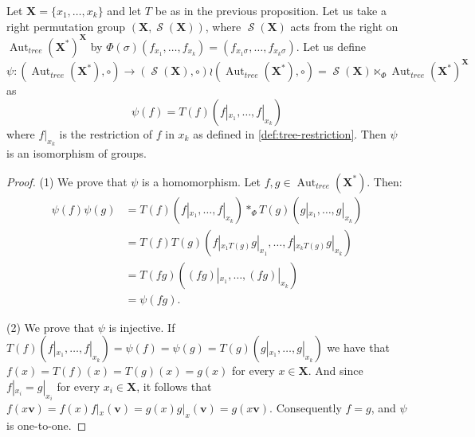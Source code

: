 \documentclass[mat1]{fmfdeloTS2.0}
\newcommand{\word}{\mathbf}				%
\newcommand{\abece}{\mathbf{X}}			%
\newcommand{\fslovar}{\mathbf{X^*}}		%
\DeclareMathOperator{\aut}{\mathrm{Aut}}		%
\DeclareMathOperator{\symm}{\mathcal{S}}		%
\begin{document}
\begin{proposition}\label{prop:isom auttree and wreath}
Let $\abece=\{x_1,\ldots,x_k\}$ and let $T$ be as in the previous proposition. Let us take a right permutation group $(\abece,\symm(\abece))$, where $\symm(\abece)$ acts from the right on $\aut_{tree}(\fslovar)^\abece$ by $\Phi(\sigma)(f_{x_1},\ldots,f_{x_k})=(f_{x_1\sigma},\ldots,f_{x_k\sigma})$. Let us define $\psi:(\aut_{tree}(\fslovar),\circ)\longrightarrow (\symm(\abece),\circ) \wr (\aut_{tree}(\fslovar),\circ) = \symm(\abece)\ltimes_\Phi \aut_{tree}(\fslovar)^\abece$ as
$$\psi(f)=T(f)(f|_{x_1},\ldots,f|_{x_k})$$
where $f|_{x_k}$ is the restriction of $f$ in $x_k$ as defined in \autoref{def:tree-restriction}. Then $\psi$ is an isomorphism of groups.
\end{proposition}
\begin{proof}
(1) We prove that $\psi$ is a homomorphism. Let $f,g\in\aut_{tree}(\fslovar)$. Then:
\begin{align*}
\psi(f)\psi(g)&=T(f)(f|_{x_1},\ldots,f|_{x_k})		*_\Phi	T(g)(g|_{x_1},\ldots,g|_{x_k})\\
&=	T(f)T(g)(f|_{x_1T(g)}g|_{x_1},\ldots ,f|_{x_kT(g)} g|_{x_k})\\
&=T(fg)((fg)|_{x_1},\ldots ,(fg)|_{x_k})\\
&=\psi(fg).
\end{align*}

(2) We prove that $\psi$ is injective. If $T(f)(f|_{x_1},\ldots,f|_{x_k})=\psi(f)=\psi(g)=T(g)(g|_{x_1},\ldots,g|_{x_k})$ we have that $f(x)=T(f)(x)=T(g)(x)=g(x)$ for every $x\in\abece$. And since $f|_{x_i}=g|_{x_i}$ for every $x_i\in\abece$, it follows that $f(x\word{v})=f(x)f|_x(\word{v})=g(x)g|_x(\word{v})=g(x\word{v})$. Consequently $f=g$, and $\psi$ is one-to-one.


\end{proof}
\end{document}
